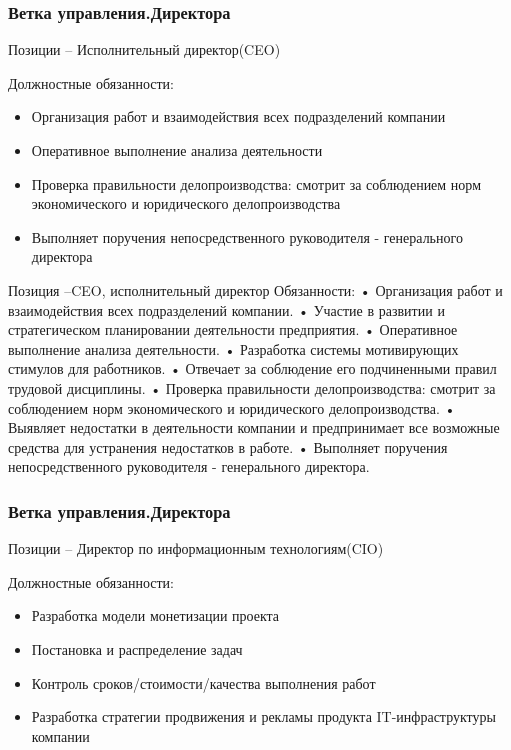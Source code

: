 \documentclass{../industrial-development}
\begin{document}
\begin{frame} \frametitle{Ветка управления.Директора}
 \begin{block}{}
  \alert{Позиции – Исполнительный директор(CEO)}

Должностные обязанности: 
  \end{block}
  \begin{itemize}
  \item Организация работ и взаимодействия всех подразделений компании
 \item Оперативное выполнение анализа деятельности
 \item Проверка правильности делопроизводства: смотрит за соблюдением норм экономического и юридического делопроизводства
  \item Выполняет поручения непосредственного руководителя - генерального директора
  \end{itemize}
\end{frame}

\lecturenotes
Позиция –CEO, исполнительный директор
Обязанности:
•	Организация работ и взаимодействия всех подразделений компании. 
•	Участие в развитии и стратегическом планировании деятельности предприятия. 
•	Оперативное выполнение анализа деятельности. 
•	Разработка системы мотивирующих стимулов для работников. 
•	Отвечает за соблюдение его подчиненными правил трудовой дисциплины. 
•	Проверка правильности делопроизводства: смотрит за соблюдением норм экономического и юридического делопроизводства.
•	 Выявляет недостатки в деятельности компании и предпринимает все возможные средства для устранения недостатков в работе. 
•	Выполняет поручения непосредственного руководителя - генерального директора. 


\begin{frame} \frametitle{Ветка управления.Директора}
 \begin{block}{}
  \alert{Позиции – Директор по информационным технологиям(CIO)}

Должностные обязанности: 
  \end{block}
  \begin{itemize}
  \item Разработка модели монетизации проекта
 \item Постановка и распределение задач
\item Контроль сроков/стоимости/качества выполнения работ
 \item Разработка стратегии продвижения и рекламы продукта
   IT-инфраструктуры компании
  \end{itemize}
\end{frame}
\end{document}
